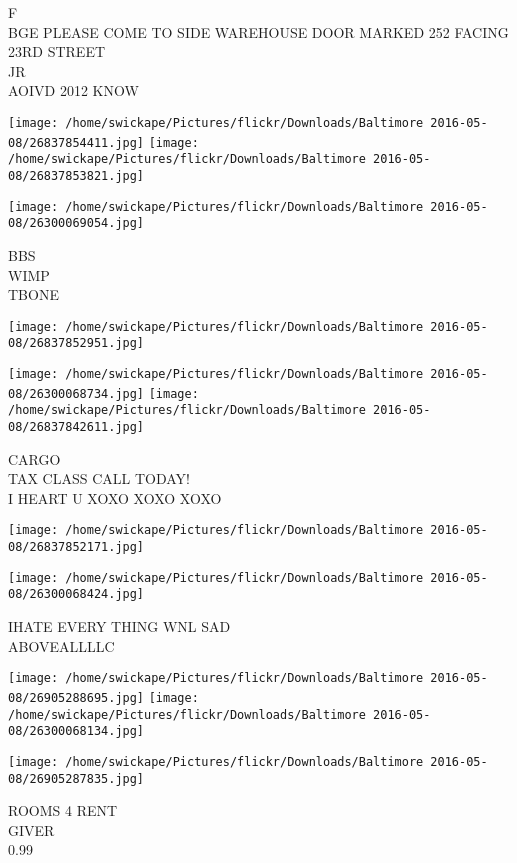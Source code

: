 \documentclass[10pt,letterpaper]{article}
\begin{document}
F\\
BGE PLEASE COME TO SIDE WAREHOUSE DOOR MARKED 252 FACING 23RD STREET\\
JR\\
AOIVD 2012 KNOW
\pagebreak

\texttt{[image: /home/swickape/Pictures/flickr/Downloads/Baltimore 2016-05-08/26837854411.jpg]}
\texttt{[image: /home/swickape/Pictures/flickr/Downloads/Baltimore 2016-05-08/26837853821.jpg]}

\texttt{[image: /home/swickape/Pictures/flickr/Downloads/Baltimore 2016-05-08/26300069054.jpg]}

BBS\\
WIMP\\
TBONE
\pagebreak

\texttt{[image: /home/swickape/Pictures/flickr/Downloads/Baltimore 2016-05-08/26837852951.jpg]}

\vspace{0.25in}
\texttt{[image: /home/swickape/Pictures/flickr/Downloads/Baltimore 2016-05-08/26300068734.jpg]}
\texttt{[image: /home/swickape/Pictures/flickr/Downloads/Baltimore 2016-05-08/26837842611.jpg]}

CARGO\\
TAX CLASS CALL TODAY!\\
I HEART U XOXO XOXO XOXO
\pagebreak

\texttt{[image: /home/swickape/Pictures/flickr/Downloads/Baltimore 2016-05-08/26837852171.jpg]}

\vspace{0.25in}
\texttt{[image: /home/swickape/Pictures/flickr/Downloads/Baltimore 2016-05-08/26300068424.jpg]}

IHATE EVERY THING WNL SAD\\
ABOVEALLLLC
\pagebreak

\texttt{[image: /home/swickape/Pictures/flickr/Downloads/Baltimore 2016-05-08/26905288695.jpg]}
\texttt{[image: /home/swickape/Pictures/flickr/Downloads/Baltimore 2016-05-08/26300068134.jpg]}

\vspace{0.25in}
\texttt{[image: /home/swickape/Pictures/flickr/Downloads/Baltimore 2016-05-08/26905287835.jpg]}

ROOMS 4 RENT\\
GIVER\\
0.99
\pagebreak
\end{document}
